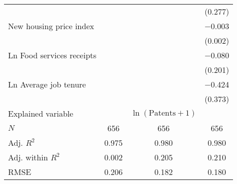 \begin{tabular}[t]{lccc}
 &  &  & (\num{0.277})\\
New housing price index &  &  & \num{-0.003}\\
 &  &  & (\num{0.002})\\
Ln Food services receipts &  &  & \num{-0.080}\\
 &  &  & (\num{0.201})\\
Ln Average job tenure &  &  & \num{-0.424}\\
 &  &  & (\num{0.373})\\
\midrule
Explained variable &  & $\ln(\text{Patents}+1)$ & \\
$N$ & \num{656} & \num{656} & \num{656}\\
Adj. $R^2$ & \num{0.975} & \num{0.980} & \num{0.980}\\
Adj. within $R^2$ & \num{0.002} & \num{0.205} & \num{0.210}\\
RMSE & \num{0.206} & \num{0.182} & \num{0.180}\\
\bottomrule
\end{tabular}
